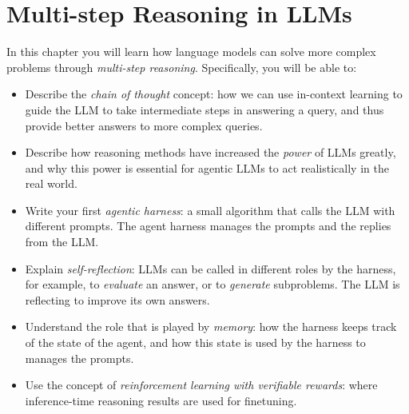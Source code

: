 \chapter{Multi-step Reasoning in LLMs}\label{chap:reasoning}


\begin{learningbox}
In this chapter you will learn how  language models can solve more complex problems through {\em multi-step reasoning}. 
Specifically, you will be able to:
\begin{itemize}[leftmargin=*, nosep]
    \item Describe the {\em chain of thought} concept: how we can use in-context learning to guide the LLM to take intermediate steps in answering a query, and thus provide better answers to more complex queries.
    \item Describe how reasoning methods have increased the {\em power} of LLMs greatly, and why this power is essential for agentic LLMs to act realistically in the real world. 
    \item Write your first {\em agentic harness}: a small algorithm that calls the LLM with different prompts.  The agent harness manages the prompts and the replies from the LLM.   
    \item Explain {\em self-reflection}:  LLMs can be called in different roles by the harness, for example, to {\em evaluate} an answer, or to {\em generate} subproblems. The LLM is reflecting to improve its own answers. 
    \item Understand the role that is played by {\em memory}: how the  harness keeps track of the state of the agent, and how this state is used by the harness to manages the prompts.
    \item Use the concept of {\em reinforcement learning with verifiable rewards}: where inference-time reasoning results are used for finetuning.
\end{itemize}
\end{learningbox}

